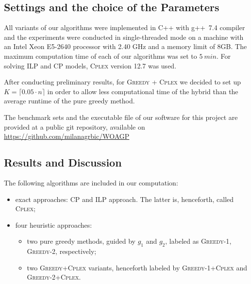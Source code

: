 \documentclass[runningheads,a4paper]{elsarticle}
\begin{document}
     \subsection{Settings and the choice of the Parameters}
      All variants of our algorithms were implemented in C++ with g++~7.4 compiler and the experiments were conducted in single-threaded mode on a machine with an Intel Xeon E5-2640 processor with 2.40 GHz and a memory limit of 8GB. The maximum computation time of each of our algorithms was set to $5\ min$. For solving ILP and CP models, \textsc{Cplex} version 12.7 was used.

      After conducting preliminary results, for
        \textsc{Greedy + \textsc{Cplex}} we decided to set up $K = \lceil 0.05 \cdot n \rceil$ in order to allow less computational time of the hybrid than the average runtime of the pure greedy method.

     The benchmark sets and the executable file of our software for this project are provided at a public git repository, available on \href{https://github.com/milanagrbic/WOAGP}{https://github.com/milanagrbic/WOAGP}
	\subsection{Results and Discussion}
        The following algorithms are included in our computation:
        \begin{itemize}
        	\item  exact approaches: CP and ILP approach. The latter is, henceforth, called \textsc{Cplex};
            \item four heuristic approaches:
           \begin{itemize}
           	\item two pure greedy methods, guided by $g_1$ and $g_2$, labeled as \textsc{Greedy-1}, \textsc{Greedy-2}, respectively;
            \item two \textsc{Greedy+Cplex} variants, henceforth labeled by  \textsc{Greedy-1}+\textsc{Cplex} and
            \textsc{Greedy-2}+\textsc{Cplex}.
        \end{itemize}
    \end{itemize}
\end{document}
